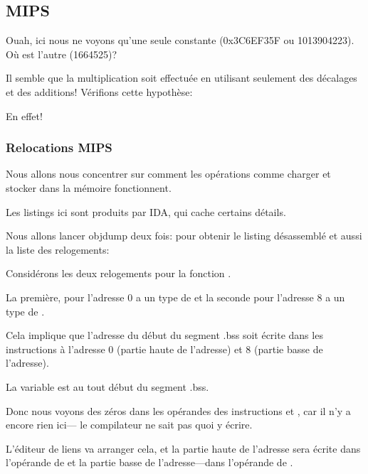 \subsection{MIPS}



Ouah, ici nous ne voyons qu'une seule constante (0x3C6EF35F ou 1013904223).
Où est l'autre (1664525)?

Il semble que la multiplication soit effectuée en utilisant seulement des décalages
et des additions!
Vérifions cette hypothèse:





En effet!

\subsubsection{Relocations MIPS}

Nous allons nous concentrer sur comment les opérations comme charger et stocker dans
la mémoire fonctionnent.

Les listings ici sont produits par IDA, qui cache certains détails.

Nous allons lancer objdump deux fois: pour obtenir le listing désassemblé et aussi
la liste des relogements:



Considérons les deux relogements pour la fonction .

La première, pour l'adresse 0 a un type de  et la seconde pour
l'adresse 8 a un type de .

Cela implique que l'adresse du début du segment .bss soit écrite dans les instructions
à l'adresse 0 (partie haute de l'adresse) et 8 (partie basse de l'adresse).

La variable  est au tout début du segment .bss.

Donc nous voyons des zéros dans les opérandes des instructions \LUI et \SW, car il
n'y a encore rien ici--- le compilateur ne sait pas quoi y écrire.

L'éditeur de liens va arranger cela, et la partie haute de l'adresse sera écrite
dans l'opérande de \LUI et la partie basse de l'adresse---dans l'opérande de \SW.

